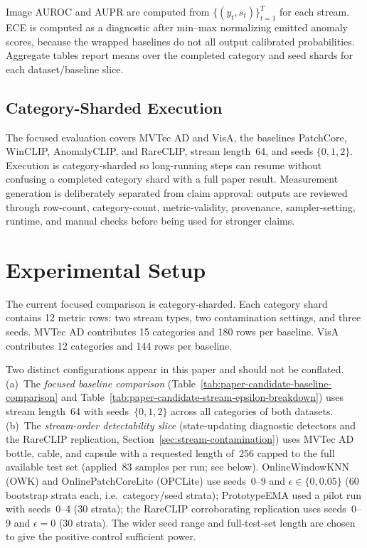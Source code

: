 \documentclass[runningheads]{llncs}
\newcommand{\tabref}[1]{Table~\ref{#1}}
\newcommand{\secref}[1]{Section~\ref{#1}}
\begin{document}
Image AUROC and AUPR are computed from \(\{(y_t,s_t)\}_{t=1}^{T}\) for each
stream. ECE is computed as a diagnostic after min--max normalizing emitted
anomaly scores, because the wrapped baselines do not all output calibrated
probabilities. Aggregate tables report means over the completed category and
seed shards for each dataset/baseline slice.

\subsection{Category-Sharded Execution}
The focused evaluation covers MVTec AD and VisA, the baselines
PatchCore, WinCLIP, AnomalyCLIP, and RareCLIP, stream length~64, and seeds
\(\{0,1,2\}\). Execution is category-sharded so long-running steps can resume
without confusing a completed category shard with a full paper result.
Measurement generation is deliberately separated from claim approval: outputs
are reviewed through row-count, category-count, metric-validity, provenance,
sampler-setting, runtime, and manual checks before being used for stronger
claims.


\section{Experimental Setup}
\label{sec:setup}
The current focused comparison is category-sharded. Each category shard
contains 12 metric rows: two stream types, two contamination settings, and
three seeds. MVTec AD contributes 15 categories and 180 rows per baseline.
VisA contributes 12 categories and 144 rows per baseline.

Two distinct configurations appear in this paper and should not be conflated.
(a)~The \emph{focused baseline comparison} (\tabref{tab:paper-candidate-baseline-comparison}
and \tabref{tab:paper-candidate-stream-epsilon-breakdown})
uses stream length~64 with seeds~$\{0,1,2\}$ across all categories of both
datasets. (b)~The \emph{stream-order detectability slice} (state-updating
diagnostic detectors and the RareCLIP replication, \secref{sec:stream-contamination})
uses MVTec AD bottle, cable, and capsule with a requested length of~256 capped
to the full available test set (applied~83 samples per run; see below).
OnlineWindowKNN (OWK) and OnlinePatchCoreLite (OPCLite) use seeds~0--9 and
$\epsilon \in \{0,0.05\}$ (60 bootstrap strata each, i.e.\ category/seed strata); PrototypeEMA used a
pilot run with seeds~0--4 (30 strata); the RareCLIP corroborating replication
uses seeds~0--9 and $\epsilon{=}0$ (30 strata). The wider seed range and
full-test-set length are chosen to give the positive control sufficient power.
\end{document}
